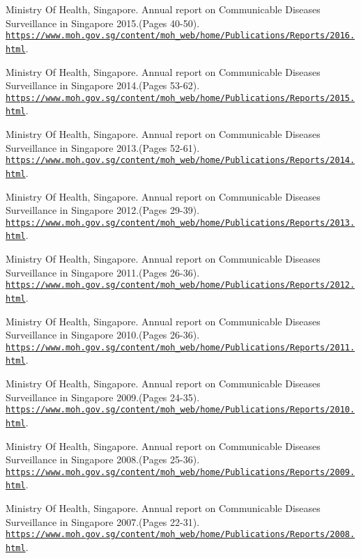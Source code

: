 \documentclass[11pt]{exam}
\begin{document}
\begin{thebibliography}{28}
Ministry Of Health, Singapore. Annual report on Communicable Diseases Surveillance in Singapore 2015.(Pages 40-50).
\\\texttt{\url{https://www.moh.gov.sg/content/moh_web/home/Publications/Reports/2016.html}}.

Ministry Of Health, Singapore. Annual report on Communicable Diseases Surveillance in Singapore 2014.(Pages 53-62).
\\\texttt{\url{https://www.moh.gov.sg/content/moh_web/home/Publications/Reports/2015.html}}.

Ministry Of Health, Singapore. Annual report on Communicable Diseases Surveillance in Singapore 2013.(Pages 52-61).
\\\texttt{\url{https://www.moh.gov.sg/content/moh_web/home/Publications/Reports/2014.html}}.

Ministry Of Health, Singapore. Annual report on Communicable Diseases Surveillance in Singapore 2012.(Pages 29-39).
\\\texttt{\url{https://www.moh.gov.sg/content/moh_web/home/Publications/Reports/2013.html}}.

Ministry Of Health, Singapore. Annual report on Communicable Diseases Surveillance in Singapore 2011.(Pages 26-36).
\\\texttt{\url{https://www.moh.gov.sg/content/moh_web/home/Publications/Reports/2012.html}}.

Ministry Of Health, Singapore. Annual report on Communicable Diseases Surveillance in Singapore 2010.(Pages 26-36).
\\\texttt{\url{https://www.moh.gov.sg/content/moh_web/home/Publications/Reports/2011.html}}.

Ministry Of Health, Singapore. Annual report on Communicable Diseases Surveillance in Singapore 2009.(Pages 24-35).
\\\texttt{\url{https://www.moh.gov.sg/content/moh_web/home/Publications/Reports/2010.html}}.

Ministry Of Health, Singapore. Annual report on Communicable Diseases Surveillance in Singapore 2008.(Pages 25-36).
\\\texttt{\url{https://www.moh.gov.sg/content/moh_web/home/Publications/Reports/2009.html}}.

Ministry Of Health, Singapore. Annual report on Communicable Diseases Surveillance in Singapore 2007.(Pages 22-31).
\\\texttt{\url{https://www.moh.gov.sg/content/moh_web/home/Publications/Reports/2008.html}}.


\end{thebibliography}
\end{document}
